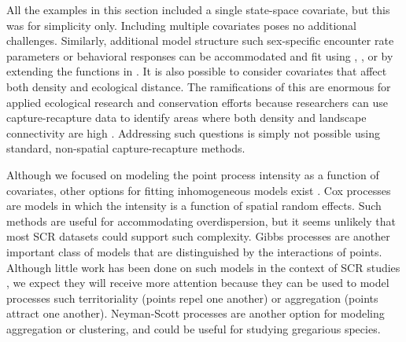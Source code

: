 All the examples in this section included a single state-space
covariate, but this was for simplicity only. Including multiple
covariates poses no additional challenges. Similarly, additional model
structure such sex-specific encounter rate parameters or behavioral
responses can be accommodated and fit using \secr, \bugs, or by
extending the functions in \scrbook. It is also possible to consider
covariates that affect both density and ecological
distance. The ramifications of this are enormous for applied
ecological research and conservation efforts because %
researchers can use capture-recapture data to identify areas where
both density and landscape connectivity are high
\citep{royle_etal:2012ecol}. Addressing such questions
is simply not possible using standard, non-spatial capture-recapture
methods. %


Although we focused on modeling the point process intensity as a
function of covariates, other options for fitting inhomogeneous models
exist \citep{illian_etal:2008}. Cox processes are  models in which the
intensity is a function of spatial random effects. Such
methods are useful for accommodating overdispersion, but it seems unlikely that
most SCR datasets could support such complexity. Gibbs processes
are another important class of models that are distinguished by the
interactions of points. Although little work has been done on such
models in the context of SCR studies \citep{reich_etal:2012}, we
expect they will receive more
attention because they can be used to model processes such
territoriality (points repel one another) or aggregation (points
attract one another). Neyman-Scott processes are another option for
modeling aggregation or clustering, and could be useful for studying
gregarious species.

